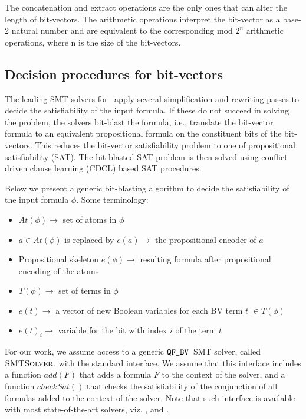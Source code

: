 The
concatenation and extract operations are the only ones that can alter the
length of bit-vectors. The arithmetic operations interpret the bit-vector as a base-2 natural number and are
equivalent to the corresponding mod $2^n$ arithmetic operations, where n is the size of the bit-vectors.

\subsection{Decision procedures for bit-vectors}

The leading SMT solvers for \qfbv~apply several simplification and
rewriting passes to decide the satisfiability of the input formula.
If these do not succeed in solving the problem, the solvers bit-blast
the formula, i.e., translate the bit-vector formula to an
equivalent propositional formula on the constituent bits of the
bit-vectors.  This reduces the bit-vector satisfiability problem to
one of propositional satisfiability (SAT).
%
The bit-blasted SAT problem is then solved using conflict driven clause
learning (CDCL)\cite{cdcl1,cdcl2} based SAT procedures.
%

Below we present a generic bit-blasting algorithm to decide the satisfiability of the input formula $\phi$. Some terminology:

\begin{itemize}

\item $At(\phi)\rightarrow$ set of atoms in $\phi$ 
\item $a \in At(\phi)$ is replaced by $e(a) \rightarrow$ the propositional encoder of $a$ 
\item Propositional skeleton $e(\phi) \rightarrow$ resulting formula after propositional encoding of the atoms 
\item $T(\phi)\rightarrow$ set of terms in $\phi$ 
\item $e(t)\rightarrow$ a vector of new Boolean variables for each BV term $t$ $\in T(\phi)$ 
\item $e(t)_i\rightarrow$ variable for the bit with index $i$ of the term $t$ 
\end{itemize}



For our work, we assume access to a generic $\texttt{QF\_BV}$~SMT solver, called
$\textsc{SMTSolver}$, with the standard interface.
%
We assume that this interface includes a function $add(F)$ that adds a
formula $F$ to the context of the solver, and a function $checkSat()$
that checks the satisfiability of the conjunction of all formulas
added to the context of the solver.  Note that such interface is
available with most state-of-the-art solvers, viz. {\boolector},
{\cvcfour} and {\zthree}.


